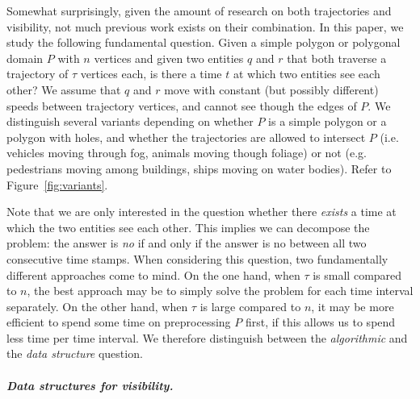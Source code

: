 \documentclass[UKenglish]{lipics-v2019}
\begin{document}
Somewhat surprisingly, given the amount of research on both trajectories and visibility, not much previous work exists on their combination.
%
In this paper, we study the following fundamental question.
  Given a simple polygon or polygonal domain $P$ with $n$ vertices and given two entities $q$ and $r$ that both traverse a trajectory of $\tau$ vertices each, is there a time $t$ at which two entities see each other?
  We assume that $q$ and $r$ move with constant (but possibly different) speeds between trajectory vertices, and cannot see though the edges of $P$.
  We distinguish several variants depending on whether $P$ is a simple polygon or a polygon with holes, and whether the trajectories are allowed to intersect $P$ (i.e. vehicles moving through fog, animals moving though foliage) or not (e.g. pedestrians moving among buildings, ships moving on water bodies). Refer to Figure~\ref {fig:variants}.
%

Note that we are only interested in the question whether there {\em
  exists} a time at which the two entities see each other. %
This implies we can decompose the problem: the answer is {\em no} if and only if the answer is no between all two consecutive time stamps.
When considering this question, two fundamentally different approaches come to mind. On the one hand, when $\tau$ is small compared to $n$, the best approach may be to simply solve the problem for each time interval separately. On the other hand, when $\tau$ is large compared to $n$, it may be more efficient to spend some time on preprocessing $P$ first, if this allows us to spend less time per time interval.
We therefore distinguish between the {\em algorithmic} and the {\em data structure} question.

\subparagraph {Data structures for visibility.}
\end{document}
